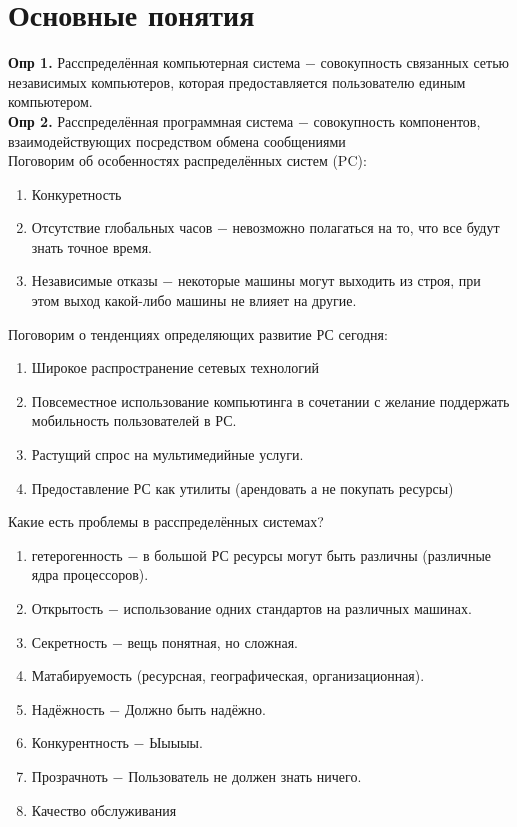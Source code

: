 \documentclass[a4paper, 12pt, titlepage, finall]{extreport}
\begin{document}
        \section{Основные понятия}
            \textbf{Опр 1.} Расспределённая компьютерная система $-$ совокупность связанных сетью независимых компьютеров, 
            которая предоставляется пользователю единым компьютером.\\
            \textbf{Опр 2.} Расспределённая программная система $-$ совокупность компонентов, взаимодействующих посредством обмена сообщениями\\
            Поговорим об особенностях распределённых систем (PC):
            \begin{enumerate}
                \item Конкуретность
                \item Отсутствие глобальных часов $-$ невозможно полагаться на то, что все будут знать точное время.
                \item Независимые отказы $-$ некоторые машины могут выходить из строя, при этом выход какой-либо машины не влияет на другие.
            \end{enumerate}
            Поговорим о тенденциях определяющих развитие РС сегодня:
            \begin{enumerate}
                \item Широкое распространение сетевых технологий
                \item Повсеместное использование компьютинга в сочетании с желание поддержать мобильность пользователей в РС.
                \item Растущий спрос на мультимедийные услуги.
                \item Предоставление РС как утилиты (арендовать а не покупать ресурсы)
            \end{enumerate}
            Какие есть проблемы в расспределённых системах?
            \begin{enumerate}
                \item гетерогенность $-$ в большой РС ресурсы могут быть различны (различные ядра процессоров).
                \item Открытость $-$ использование одних стандартов на различных машинах.
                \item Секретность $-$ вещь понятная, но сложная.
                \item Матабируемость (ресурсная, географическая, организационная).
                \item Надёжность $-$ Должно быть надёжно.
                \item Конкурентность $-$ Ыыыыы.
                \item Прозрачноть $-$ Пользователь не должен знать ничего.
                \item Качество обслуживания
            \end{enumerate}
\end{document}
